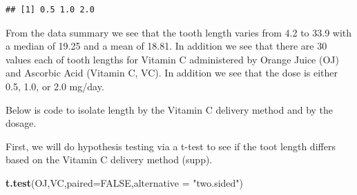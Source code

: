 \documentclass[
]{article}
\newenvironment{Shaded}{\begin{snugshade}}{\end{snugshade}}
\newcommand{\CommentTok}[1]{\textcolor[rgb]{0.56,0.35,0.01}{\textit{#1}}}
\newcommand{\DataTypeTok}[1]{\textcolor[rgb]{0.13,0.29,0.53}{#1}}
\newcommand{\DecValTok}[1]{\textcolor[rgb]{0.00,0.00,0.81}{#1}}
\newcommand{\FloatTok}[1]{\textcolor[rgb]{0.00,0.00,0.81}{#1}}
\newcommand{\KeywordTok}[1]{\textcolor[rgb]{0.13,0.29,0.53}{\textbf{#1}}}
\newcommand{\NormalTok}[1]{#1}
\newcommand{\OperatorTok}[1]{\textcolor[rgb]{0.81,0.36,0.00}{\textbf{#1}}}
\newcommand{\OtherTok}[1]{\textcolor[rgb]{0.56,0.35,0.01}{#1}}
\newcommand{\StringTok}[1]{\textcolor[rgb]{0.31,0.60,0.02}{#1}}
\begin{document}
\begin{Shaded}
\end{Shaded}

\begin{verbatim}
## [1] 0.5 1.0 2.0
\end{verbatim}

From the data summary we see that the tooth length varies from 4.2 to
33.9 with a median of 19.25 and a mean of 18.81. In addition we see that
there are 30 values each of tooth lengths for Vitamin C administered by
Orange Juice (OJ) and Ascorbic Acid (Vitamin C, VC). In addition we see
that the dose is either 0.5, 1.0, or 2.0 mg/day.

Below is code to isolate length by the Vitamin C delivery method and by
the dosage.

\begin{Shaded}
\end{Shaded}

First, we will do hypothesis testing via a t-test to see if the toot
length differs based on the Vitamin C delivery method (supp).

\begin{Shaded}
\begin{Highlighting}[]
\KeywordTok{t.test}\NormalTok{(OJ,VC,}\DataTypeTok{paired=}\OtherTok{FALSE}\NormalTok{,}\DataTypeTok{alternative =} \StringTok{"two.sided"}\NormalTok{)}
\end{Highlighting}
\end{Shaded}
\end{document}
